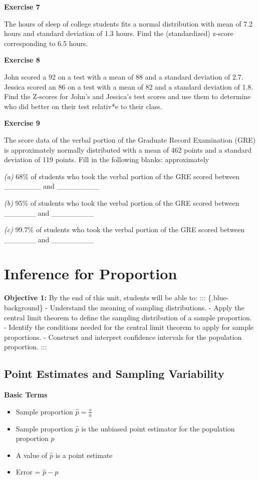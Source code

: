 \documentclass[
]{book}
\providecommand{\tightlist}{%
  \setlength{\itemsep}{0pt}\setlength{\parskip}{0pt}}
\begin{document}
\textbf{Exercise 7}

The hours of sleep of college students fits a normal distribution with mean of 7.2 hours and standard deviation of 1.3 hours. Find the (standardized) z-score corresponding to 6.5 hours.

\textbf{Exercise 8}

John scored a 92 on a test with a mean of 88 and a standard deviation of 2.7. Jessica scored an 86 on a test with a mean of 82 and a standard deviation of 1.8. Find the Z-scores for John's and Jessica's test scores and use them to determine who did better on their test relativ*e to their class.

\textbf{Exercise 9}

The score data of the verbal portion of the Graduate Record Examination (GRE) is approximately normally distributed with a mean of 462 points and a standard deviation of 119 points. Fill in the following blanks: approximately

\emph{(a)} 68\% of students who took the verbal portion of the GRE scored between \_\_\_\_\_\_\_ and \_\_\_\_\_\_\_\_

\emph{(b)} 95\% of students who took the verbal portion of the GRE scored between \_\_\_\_\_\_ and \_\_\_\_\_\_\_\_

\emph{(c)} 99.7\% of students who took the verbal portion of the GRE scored between \_\_\_\_\_\_ and \_\_\_\_\_\_\_\_

\chapter{Inference for Proportion}\label{inference-for-proportion}

\textbf{Objective 1:} By the end of this unit, students will be able to:
::: \{.blue-background\}
- Understand the meaning of sampling distributions.
- Apply the central limit theorem to define the sampling distribution of a sample proportion.
- Identify the conditions needed for the central limit theorem to apply for sample proportions.
- Construct and interpret confidence intervals for the population proportion.
:::

\section{Point Estimates and Sampling Variability}\label{point-estimates-and-sampling-variability}

\textbf{Basic Terms}

\begin{itemize}
\tightlist
\item
  Sample proportion \(\hat{p} = \frac{x}{n}\)\\
\item
  Sample proportion \(\hat{p}\) is the unbiased point estimator for the population proportion \(p\)
\item
  A value of \(\hat{p}\) is a point estimate
\item
  Error = \(\hat{p} - p\)
\end{itemize}
\end{document}
